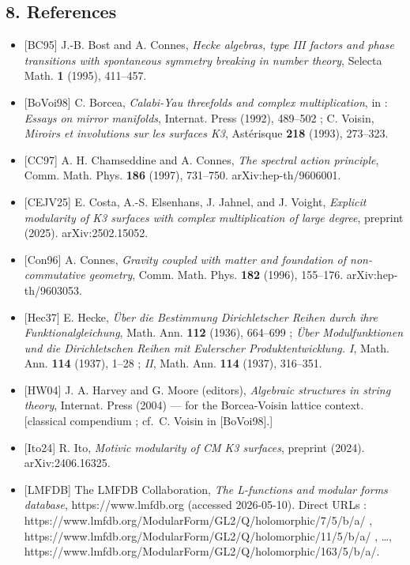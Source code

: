 \documentclass[
  11pt,
  a4paper,
]{amsart}
\begin{document}
\hypertarget{references}{%
\subsection{8. References}\label{references}}

\begin{itemize}
\item
  {[}BC95{]} J.-B. Bost and A. Connes, \emph{Hecke algebras, type III factors and phase transitions with spontaneous symmetry breaking in number theory}, Selecta Math. \textbf{1} (1995), 411--457.
\item
  {[}BoVoi98{]} C. Borcea, \emph{Calabi-Yau threefolds and complex multiplication}, in : \emph{Essays on mirror manifolds}, Internat. Press (1992), 489--502 ; C. Voisin, \emph{Miroirs et involutions sur les surfaces K3}, Astérisque \textbf{218} (1993), 273--323.
\item
  {[}CC97{]} A. H. Chamseddine and A. Connes, \emph{The spectral action principle}, Comm. Math. Phys. \textbf{186} (1997), 731--750. arXiv:hep-th/9606001.
\item
  {[}CEJV25{]} E. Costa, A.-S. Elsenhans, J. Jahnel, and J. Voight, \emph{Explicit modularity of K3 surfaces with complex multiplication of large degree}, preprint (2025). arXiv:2502.15052.
\item
  {[}Con96{]} A. Connes, \emph{Gravity coupled with matter and foundation of non-commutative geometry}, Comm. Math. Phys. \textbf{182} (1996), 155--176. arXiv:hep-th/9603053.
\item
  {[}Hec37{]} E. Hecke, \emph{Über die Bestimmung Dirichletscher Reihen durch ihre Funktionalgleichung}, Math. Ann. \textbf{112} (1936), 664--699 ; \emph{Über Modulfunktionen und die Dirichletschen Reihen mit Eulerscher Produktentwicklung. I}, Math. Ann. \textbf{114} (1937), 1--28 ; \emph{II}, Math. Ann. \textbf{114} (1937), 316--351.
\item
  {[}HW04{]} J. A. Harvey and G. Moore (editors), \emph{Algebraic structures in string theory}, Internat. Press (2004) --- for the Borcea-Voisin lattice context. {[}classical compendium ; cf.~C. Voisin in {[}BoVoi98{]}.{]}
\item
  {[}Ito24{]} R. Ito, \emph{Motivic modularity of CM K3 surfaces}, preprint (2024). arXiv:2406.16325.
\item
  {[}LMFDB{]} The LMFDB Collaboration, \emph{The L-functions and modular forms database}, https://www.lmfdb.org (accessed 2026-05-10). Direct URLs : https://www.lmfdb.org/ModularForm/GL2/Q/holomorphic/7/5/b/a/ , https://www.lmfdb.org/ModularForm/GL2/Q/holomorphic/11/5/b/a/ , \ldots, https://www.lmfdb.org/ModularForm/GL2/Q/holomorphic/163/5/b/a/.

\end{itemize}
\end{document}
